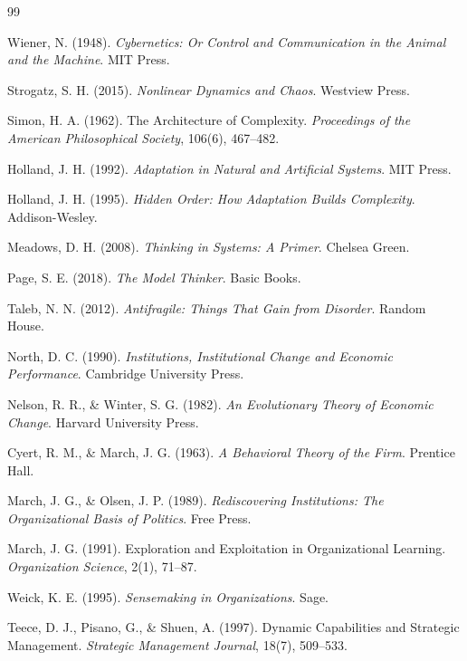 \documentclass[12pt, a4paper]{article}
\theoremstyle{named}
\begin{document}
\begin{thebibliography}{99}

Wiener, N. (1948).
\textit{Cybernetics: Or Control and Communication in the Animal and the Machine}.
MIT Press.

Strogatz, S. H. (2015).
\textit{Nonlinear Dynamics and Chaos}.
Westview Press.

Simon, H. A. (1962).
The Architecture of Complexity.
\textit{Proceedings of the American Philosophical Society}, 106(6), 467--482.

Holland, J. H. (1992).
\textit{Adaptation in Natural and Artificial Systems}.
MIT Press.

Holland, J. H. (1995).
\textit{Hidden Order: How Adaptation Builds Complexity}.
Addison-Wesley.

Meadows, D. H. (2008).
\textit{Thinking in Systems: A Primer}.
Chelsea Green.

Page, S. E. (2018).
\textit{The Model Thinker}.
Basic Books.

Taleb, N. N. (2012).
\textit{Antifragile: Things That Gain from Disorder}.
Random House.

North, D. C. (1990).
\textit{Institutions, Institutional Change and Economic Performance}.
Cambridge University Press.

Nelson, R. R., \& Winter, S. G. (1982).
\textit{An Evolutionary Theory of Economic Change}.
Harvard University Press.

Cyert, R. M., \& March, J. G. (1963).
\textit{A Behavioral Theory of the Firm}.
Prentice Hall.

March, J. G., \& Olsen, J. P. (1989).
\textit{Rediscovering Institutions: The Organizational Basis of Politics}.
Free Press.

March, J. G. (1991).
Exploration and Exploitation in Organizational Learning.
\textit{Organization Science}, 2(1), 71--87.

Weick, K. E. (1995).
\textit{Sensemaking in Organizations}.
Sage.

Teece, D. J., Pisano, G., \& Shuen, A. (1997).
Dynamic Capabilities and Strategic Management.
\textit{Strategic Management Journal}, 18(7), 509--533.


\end{thebibliography}
\end{document}
